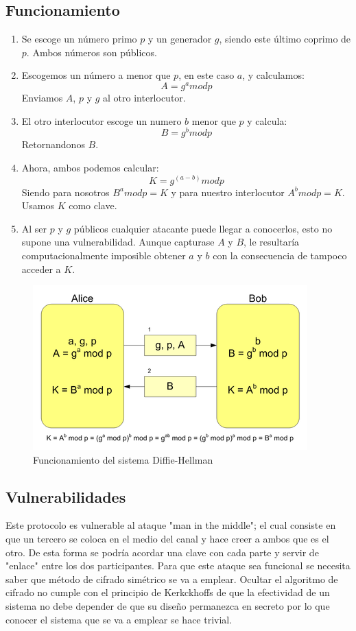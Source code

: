 \documentclass[10pt, conference]{IEEEtran}
\begin{document}
\subsection{Funcionamiento}
\begin{enumerate}
\item Se escoge un número primo $p$ y un generador $g$, siendo este último coprimo de $p$. Ambos números son públicos.
\item Escogemos un número a menor que $p$, en este caso $a$, y calculamos:
\medskip
\[
A = g^a  mod p 
\]
\medskip
Enviamos $A$, $p$ y $g$ al otro interlocutor.
\item El otro interlocutor escoge un numero $b$ menor que $p$ y calcula:
\medskip
\[
B = g^b mod p
\]
\medskip
Retornandonos $B$.
\item Ahora, ambos podemos calcular:
\medskip
\[
K = g^(a-b)mod p
\]
\medskip
Siendo para nosotros $B^a mod p = K$ y para nuestro interlocutor $A^b mod p = K$. Usamos $K$ como clave.
\item Al ser $p$ y $g$ públicos cualquier atacante puede llegar a conocerlos, esto no supone una vulnerabilidad. Aunque capturase $A$ y $B$, le resultaría computacionalmente imposible obtener $a$ y $b$ con la consecuencia de tampoco acceder a $K$. 
\end{enumerate}

\begin{figure}[h]
\begin{center}
\includegraphics[scale=0.60]{Diffie.png} \end{center}
\caption{Funcionamiento del sistema Diffie-Hellman}
\end{figure}

\subsection{Vulnerabilidades}
Este protocolo es vulnerable al ataque "man in the middle"; el cual consiste en que un tercero se coloca en el medio del canal y hace creer a ambos que es el otro. De esta forma se podría acordar una clave con cada parte y servir de "enlace" entre los dos participantes. Para que este ataque sea funcional se necesita saber que método de cifrado simétrico se va a emplear. Ocultar el algoritmo de cifrado no cumple con el principio de Kerkckhoffs de que la efectividad de un sistema no debe depender de que su diseño
permanezca en secreto por lo que conocer el sistema que se va a emplear se hace trivial.
\end{document}
